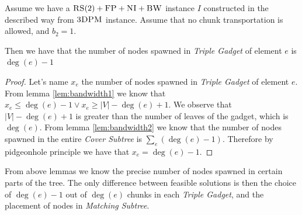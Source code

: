 \documentclass[preprint,12pt]{elsarticle}
\newcommand{\CC}{\textsc{NI}}
\newcommand{\FP}{\textsc{FP}}
\newcommand{\RS}{\textsc{RS}}
\newcommand{\BW}{\textsc{BW}}
\newcommand{\TDPM}{\textsc{3DPM}}
\newcommand{\numNodes}{\ensuremath{|V|}}
\newcommand{\MatchSubtree}{{\emph{Matching Subtree}}}
\newcommand{\CoverSubtree}{{\emph{Cover Subtree}}}
\newcommand{\TripleGadget}{{\emph{Triple Gadget}}}
\newcommand{\ElGadget}{{\emph{Element Gadget}}}
\newcommand{\Band}{\textsc{bw}}
\newtheorem{obs}{Observation}
\newcommand{\CostCom}{\ensuremath{b_2}}
\begin{document}
\begin{lemma}
  Assume we have a $\RS(2)+\FP+\CC+\BW$ instance $I$ constructed in the described way from $\TDPM$ instance.  Assume that no
  chunk transportation is allowed, and $\CostCom = 1$.

  Then we have that the number of nodes spawned in {\TripleGadget} of element $e$ is $\deg(e)-1$

  \label{lem:bandwidth3}
\end{lemma}

\begin{proof}
  Let's name $x_e$ the number of nodes spawned in {\TripleGadget} of element $e$.
  From lemma \ref{lem:bandwidth1} we know that $x_e \leq \deg(e) - 1 \vee x_e \geq |V| - \deg(e) + 1$. We observe that $|V| - \deg(e) + 1$ is greater than the number of leaves of the gadget, which is $\deg(e)$.
  From lemma \ref{lem:bandwidth2} we know that the number of nodes spawned in the entire {\CoverSubtree} is $\sum_e (\deg(e)-1)$. Therefore by pidgeonhole principle we have that $x_e = \deg(e)-1$.
\end{proof}

From above lemmas we know the precise number of nodes spawned in certain parts of the tree. The only difference between feasible solutions is then the choice of $\deg(e) - 1$ out of $\deg(e)$ chunks in each {\TripleGadget}, and the placement of nodes in {\MatchSubtree}.

%
% 
%
%
% 
%
%
%
%
%
\end{document}
